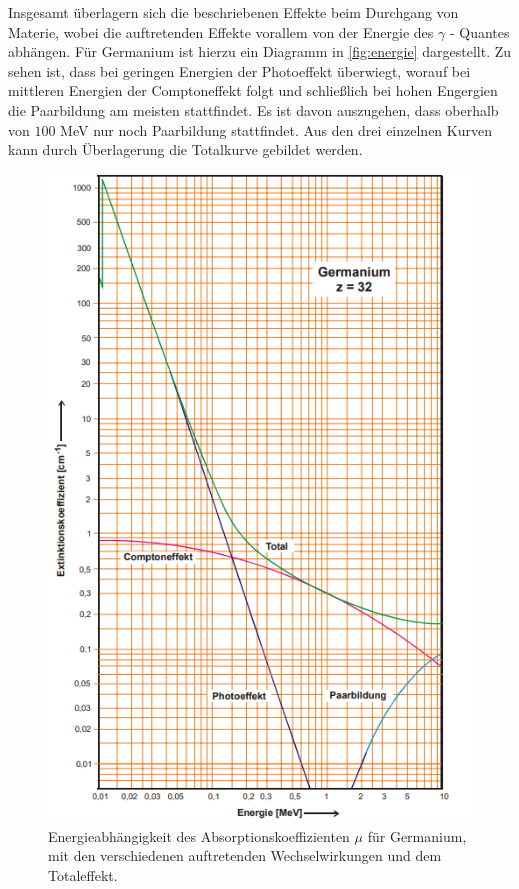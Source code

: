 Insgesamt überlagern sich die beschriebenen Effekte beim Durchgang von Materie, wobei die auftretenden Effekte vorallem von der Energie 
des $\gamma$ - Quantes abhängen. Für Germanium ist hierzu ein Diagramm in \autoref{fig:energie} dargestellt. Zu sehen ist, dass bei geringen 
Energien der Photoeffekt überwiegt, worauf bei mittleren Energien der Comptoneffekt folgt und schließlich bei hohen Engergien die Paarbildung 
am meisten stattfindet. Es ist davon auszugehen, dass oberhalb von $100$ MeV nur noch Paarbildung stattfindet. Aus den drei einzelnen Kurven
kann durch Überlagerung die Totalkurve gebildet werden.
\begin{figure}
        \centering
        \includegraphics[width=\textwidth]{content/energieabhaengigkeit.png}
        \caption{Energieabhängigkeit des Absorptionskoeffizienten $\mu$ für Germanium, mit den verschiedenen auftretenden Wechselwirkungen und dem Totaleffekt\cite[236]{V704}.}
        \label{fig:energie}
    \end{figure}

